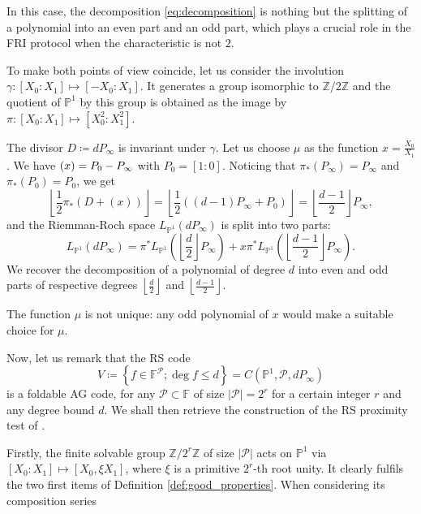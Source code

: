 \documentclass[a4paper,USenglish,autoref]{lipics-v2021}
\newcommand\F{\mathbb{F}}
\newcommand\PP{\mathbb{P}}
\newcommand\Z{\mathbb{Z}}
\newcommand\floor[1]{\left\lfloor #1 \right\rfloor}
\let\div\relax\DeclareMathOperator{\div}{div}
\newcommand{\set}[1]{\left\{#1\right\}}
\newcommand{\size}[1]{\left|#1\right|}
\newcommand\calP{\mathcal{P}}
\newcommand\mydef{\coloneqq}
\begin{document}
In this case, the decomposition \eqref{eq:decomposition} is nothing but the splitting of a polynomial into an even part and an odd part, which plays a crucial role in the \textsf{FRI} protocol when the characteristic is not $2$.

To make both points of view coincide, let us consider the involution $\gamma :[X_0:X_1] \mapsto [-X_0 : X_1]$. It generates a group isomorphic to $\Z/2\Z$ and the quotient of $\PP^1$ by this group is obtained as the image by $\pi:[X_0:X_1]\mapsto [X_0^2:X_1^2]$.

The divisor $D\mydef d P_\infty$ is invariant under $\gamma$. Let us choose $\mu$ as the function $x= \frac{X_0}{X_1}$. We have $\div(x) = P_0 - P_\infty$ with $P_0=[1:0]$. Noticing that $\pi_*(P_\infty)=P_\infty$ and $\pi_*(P_0)=P_0$, we get
\[\floor{\frac{1}{2}\pi_*(D + (x))}=\floor{\frac{1}{2}((d-1)P_\infty + P_0)}=\floor{\frac{d-1}{2}}P_\infty,\]
and the Riemman-Roch space $L_{\PP^1}(d P_\infty)$ is split into two parts:
\[L_{\PP^1}(d P_\infty)= \pi^*L_{\PP^1}\left(\floor{\frac{d}{2}}P_\infty\right) + x \pi^*L_{\PP^1}\left(\floor{\frac{d-1}{2}}P_\infty\right).  \]
We recover the decomposition of a polynomial of degree $d$ into even and odd parts of respective degrees $\floor{\frac{d}{2}}$ and $\floor{\frac{d-1}{2}}$.

\begin{remark}
	The function $\mu$ is not unique: any odd polynomial of $x$ would make a suitable choice for $\mu$.
\end{remark}

\medskip

Now, let us remark that the RS code \[V \mydef \set{f \in \F^\calP ; \deg f \le d} = C(\PP^1, \calP, dP_\infty)\] is a foldable AG code, for any $\calP \subset \F$ of size $\size{\calP} = 2^{r}$ for a certain integer $r$ and any degree bound $d$. We shall then retrieve the construction of the RS proximity test of \cite{BBHR18a}. 

Firstly, the finite solvable group $\Z / 2^r \Z$ of size $\size{\calP}$ acts on $\PP^1$ via $[X_0:X_1] \mapsto [X_0,\xi X_1]$, where $\xi$ is a primitive $2^r$-th root unity. It clearly fulfils the two first items of Definition \ref{def:good_properties}. When considering its composition series
\end{document}
